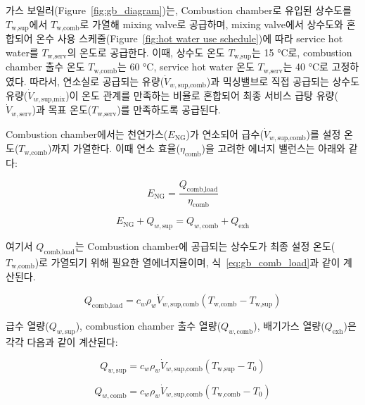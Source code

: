 \documentclass[final,5p,times,twocolumn,authoryear]{elsarticle}
\begin{document}
가스 보일러(Figure~\ref{fig:gb_diagram})는, Combustion chamber로 유입된 상수도를 $T_{\text{w,sup}}$에서 $T_{\text{w,comb}}$로
가열해 mixing valve로 공급하며, mixing valve에서 상수도와 혼합되어
온수 사용 스케줄(Figure~\ref{fig:hot water use schedule})에 따라
service hot water를 $T_{\text{w,serv}}$의 온도로 공급한다.
이때, 상수도 온도 $T_{\text{w,sup}}$는 15 °C로, combustion chamber 출수 온도 $T_{\text{w,comb}}$는 60 °C,
service hot water 온도 $T_{\text{w,serv}}$는 40 °C로 고정하였다.
따라서, 연소실로 공급되는 유량($\dot{V}_{w,\text{sup,comb}}$)과 믹싱밸브로 직접 공급되는 상수도 유량($\dot{V}_{w,\text{sup,mix}}$)이
온도 관계를 만족하는 비율로 혼합되어 최종 서비스 급탕 유량($\dot{V}_{w,\text{serv}}$)과 목표 온도($T_{\text{w,serv}}$)를 만족하도록 공급된다.

Combustion chamber에서는 천연가스($E_{\text{NG}}$)가 연소되어 급수($\dot{V}_{w,\text{sup,comb}}$)를
설정 온도($T_{\text{w,comb}}$)까지 가열한다. 이때 연소 효율($\eta_{\text{comb}}$)을 고려한 에너지 밸런스는 아래와 같다:

\begin{equation}
\label{eq:gb_energy_comb}
E_{\text{NG}} = \frac{Q_{\text{comb,load}}}{\eta_{\text{comb}}}
\end{equation}

\begin{equation}
\label{eq:gb_energy_balance_comb}
E_{\text{NG}} + Q_{w,\text{sup}} = Q_{w,\text{comb}} + Q_{\text{exh}}
\end{equation}

여기서 $Q_{\text{comb,load}}$는 Combustion chamber에 공급되는 상수도가 최종 설정 온도($T_{\text{w,comb}}$)로 가열되기 위해
필요한 열에너지율이며, 식~\eqref{eq:gb_comb_load}과 같이 계산된다.


\begin{equation}
\label{eq:gb_comb_load}
Q_{\text{comb,load}} = c_w \rho_w \dot{V}_{w,\text{sup,comb}} (T_{\text{w,comb}} - T_{\text{w,sup}})
\end{equation}

급수 열량($Q_{w,\text{sup}}$), combustion chamber 출수 열량($Q_{w,\text{comb}}$),
배기가스 열량($Q_{\text{exh}}$)은 각각 다음과 같이 계산된다:

\begin{equation}
\label{eq:gb_qw_sup}
Q_{w,\text{sup}} = c_w \rho_w \dot{V}_{w,\text{sup,comb}} (T_{\text{w,sup}} - T_0)
\end{equation}

\begin{equation}
\label{eq:gb_qw_comb}
Q_{w,\text{comb}} = c_w \rho_w \dot{V}_{w,\text{sup,comb}} (T_{\text{w,comb}} - T_0)
\end{equation}
\end{document}
